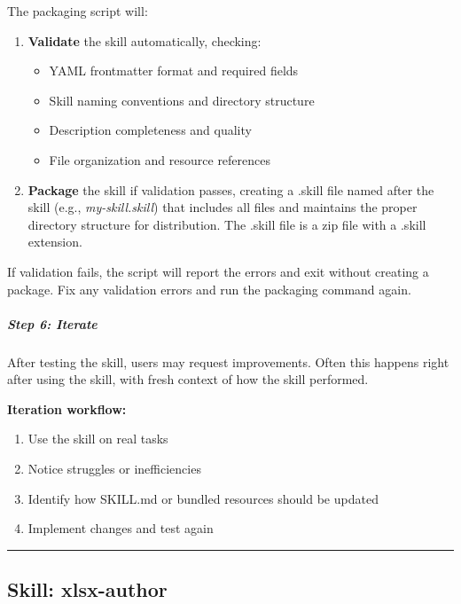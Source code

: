 \documentclass[11pt]{article}
\begin{document}
The packaging script will:


\begin{enumerate}[leftmargin=*,itemsep=2pt,topsep=2pt]
\item {} \textbf{Validate} the skill automatically, checking:
\begin{itemize}[leftmargin=*,itemsep=2pt,topsep=2pt]
\item {} YAML frontmatter format and required fields
\item {} Skill naming conventions and directory structure
\item {} Description completeness and quality
\item {} File organization and resource references
\end{itemize}
\item {} \textbf{Package} the skill if validation passes, creating a .skill file named after the skill (e.g., \emph{my-skill.skill}) that includes all files and maintains the proper directory structure for distribution. The .skill file is a zip file with a .skill extension.
\end{enumerate}

If validation fails, the script will report the errors and exit without creating a package. Fix any validation errors and run the packaging command again.


\subparagraph{Step 6: Iterate}\mbox{}\par

After testing the skill, users may request improvements. Often this happens right after using the skill, with fresh context of how the skill performed.


\textbf{Iteration workflow:}


\begin{enumerate}[leftmargin=*,itemsep=2pt,topsep=2pt]
\item {} Use the skill on real tasks
\item {} Notice struggles or inefficiencies
\item {} Identify how SKILL.md or bundled resources should be updated
\item {} Implement changes and test again
\end{enumerate}

\vspace{0.8em}\hrule\vspace{0.8em}

\subsection{Skill: xlsx-author}\label{file:skills-xlsx-author-SKILL-md}
\end{document}
